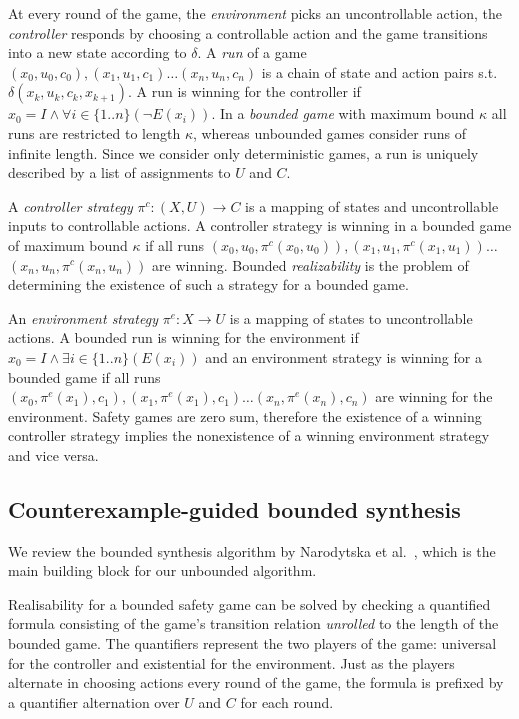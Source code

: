 \documentclass{llncs}
\begin{document}
At every round of the game, the \emph{environment} picks an uncontrollable
action, the \emph{controller} responds by choosing a controllable action and
the game transitions into a new state according to $\delta$.  A \emph{run} of a
game $(x_0, u_0, c_0), (x_1, u_1, c_1) \dots (x_n, u_n, c_n)$ is a chain of
state and action pairs s.t.\,$\delta(x_k, u_k, c_k, x_{k+1})$.  A run is
winning for the controller if $x_0 = I \land \forall i \in \{1..n\} (\lnot
E(x_i))$.  In a \emph{bounded game} with maximum bound $\kappa$ all runs are
restricted to length $\kappa$, whereas unbounded games consider runs of
infinite length.  Since we consider only deterministic games, a run is uniquely
described by a list of assignments to $U$ and $C$.

A \emph{controller strategy} $\pi^c : (X, U) \to C$ is a mapping of states and
uncontrollable inputs to controllable actions. A controller strategy is winning
in a bounded game of maximum bound $\kappa$ if all runs $(x_0, u_0, \pi^c(x_0,
u_0)), (x_1, u_1, \pi^c(x_1, u_1)) \dots$ $(x_n, u_n, \pi^c(x_n, u_n))$ are
winning.  Bounded \emph{realizability} is the problem of determining the
existence of such a strategy for a bounded game.

An \emph{environment strategy} $\pi^e : X \to U$ is a mapping of states to
uncontrollable actions. A bounded run is winning for the environment if $x_0 =
I \land \exists i \in \{1..n\} (E(x_i))$ and an environment strategy is winning
for a bounded game if all runs $(x_0, \pi^e(x_1), c_1), (x_1, \pi^e(x_1), c_1)
\dots (x_n, \pi^e(x_n), c_n)$ are winning for the environment.  Safety games
are zero sum, therefore the existence of a winning controller strategy implies
the nonexistence of a winning environment strategy and vice versa.

\subsection{Counterexample-guided bounded synthesis}

We review the bounded synthesis algorithm by Narodytska et
al.~\cite{narodytska2014}, which is the main building block for our unbounded
algorithm.

Realisability for a bounded safety game can be solved by checking a quantified
formula consisting of the game's transition relation \emph{unrolled} to the
length of the bounded game. The quantifiers represent the two players of the
game: universal for the controller and existential for the environment.  Just
as the players alternate in choosing actions every round of the game, the
formula is prefixed by a quantifier alternation over $U$ and $C$ for each
round.
\end{document}
